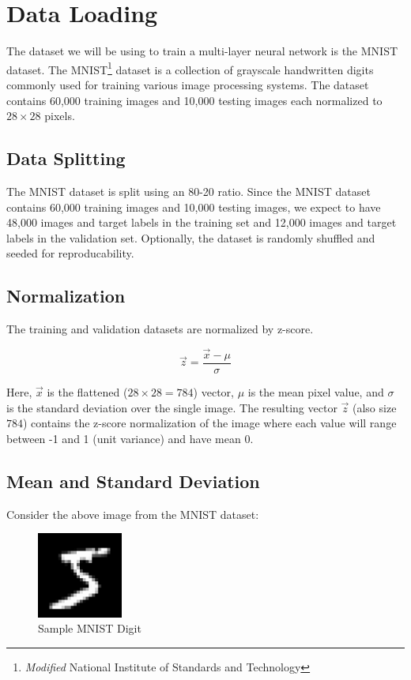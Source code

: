 \section{Data Loading}
The dataset we will be using to train a multi-layer neural network is the
MNIST dataset. The {MNIST}\footnote{\textit{Modified} National Institute of
	Standards and Technology} dataset is a collection of grayscale handwritten
digits commonly used for training various image processing systems. The dataset
contains 60,000 training images and 10,000 testing images each normalized to $28
	\times 28$ pixels.

\subsection{Data Splitting}
The MNIST dataset is split using an 80-20 ratio. Since the MNIST dataset
contains 60,000 training images and 10,000 testing images, we expect to have
48,000 images and target labels in the training set and 12,000 images and
target labels in the validation set. Optionally, the dataset is randomly
shuffled and seeded for reproducability.

\subsection{Normalization}
The training and validation datasets are normalized by z-score.

$$ \vec{z} = \frac{\vec{x} - \mu}{\sigma} $$

Here, $\vec{x}$ is the flattened ($ 28 \times 28 = 784$) vector, $\mu$ is
the mean pixel value, and $\sigma$ is the standard deviation over the single
image. The resulting vector $\vec{z}$ (also size $784$) contains the z-score
normalization of the image where each value will range between -1 and 1 (unit
variance) and have mean 0.

\subsection{Mean and Standard Deviation}
Consider the above image from the MNIST dataset:

\begin{figure}[h]
	\centering
	\includegraphics[width=0.25\textwidth]{./images/mnist_digit.png}
	\caption{Sample MNIST Digit}
	\label{fig:example}
\end{figure}

